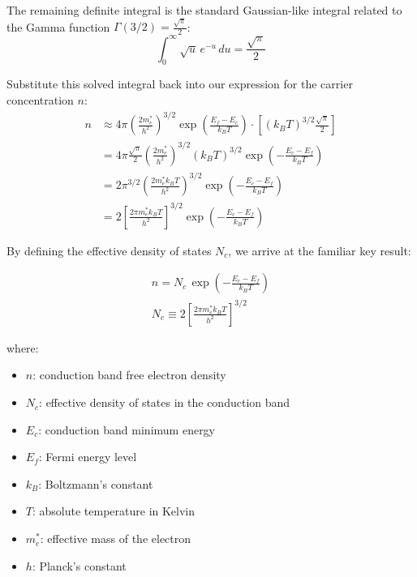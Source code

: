 The remaining definite integral is the standard Gaussian-like integral related to the Gamma function $\Gamma(3/2) = \frac{\sqrt{\pi}}{2}$:
\begin{equation*}
    \int_0^\infty \sqrt{u}\,e^{-u}\,du = \frac{\sqrt{\pi}}{2}
\end{equation*}

Substitute this solved integral back into our expression for the carrier concentration $n$:
\begin{align*}
    n & \approx 4\pi\!\left(\frac{2m^*_e}{h^2}\right)^{\!3/2}\exp\!\left(\frac{E_f - E_c}{k_B T}\right) \cdot \left[ (k_B T)^{3/2} \frac{\sqrt{\pi}}{2} \right] \\
      & = 4\pi \frac{\sqrt{\pi}}{2} \left(\frac{2m^*_e}{h^2}\right)^{\!3/2} (k_B T)^{3/2} \exp\!\left(-\frac{E_c - E_f}{k_B T}\right)                           \\
      & = 2\pi^{3/2} \left(\frac{2m^*_e k_B T}{h^2}\right)^{\!3/2} \exp\!\left(-\frac{E_c - E_f}{k_B T}\right)                                                  \\
      & = 2\!\left[\frac{2\pi m^*_e k_B T}{h^2}\right]^{\!3/2} \exp\!\left(-\frac{E_c - E_f}{k_B T}\right)
\end{align*}

By defining the effective density of states $N_c$, we arrive at the familiar key result:
\begin{keyresult}
    \begin{gather}
        n = N_c\,\exp\!\left(-\frac{E_c - E_f}{k_B T}\right) \\[1ex]
        N_c \equiv 2\!\left[\frac{2\pi m^*_e k_B T}{h^2}\right]^{\!3/2}
    \end{gather}
\end{keyresult}
where:
\begin{itemize}
    \item $n$: conduction band free electron density
    \item $N_c$: effective density of states in the conduction band
    \item $E_c$: conduction band minimum energy
    \item $E_f$: Fermi energy level
    \item $k_B$: Boltzmann's constant
    \item $T$: absolute temperature in Kelvin
    \item $m^*_e$: effective mass of the electron
    \item $h$: Planck's constant
\end{itemize}

